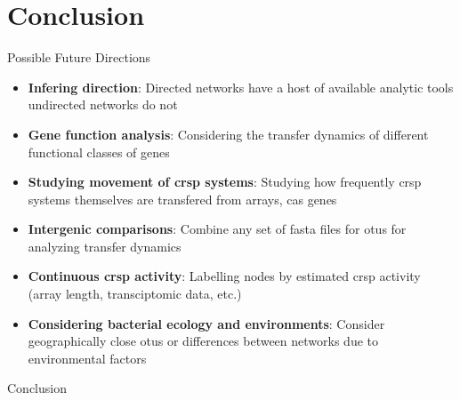 \documentclass[dvipsnames]{beamer}
\begin{document}
\section*{Conclusion}
\begin{frame}[fragile]{Possible Future Directions}
    \begin{itemize}
        \item<2-> \textbf{Infering direction}: Directed networks have a host of available analytic tools undirected networks do not
        \item<3-> \textbf{Gene function analysis}: Considering the transfer dynamics of different functional classes of genes
        \item<4-> \textbf{Studying movement of \ac{crsp} systems}: Studying how frequently \ac{crsp} systems themselves are transfered from arrays, cas genes
        \item<5-> \textbf{Intergenic comparisons}: Combine any set of fasta files for \ac{otu}s for analyzing transfer dynamics
        \item<6-> \textbf{Continuous \ac{crsp} activity}: Labelling nodes by estimated \ac{crsp} activity (array length, transciptomic data, etc.)
        \item<7-> \textbf{Considering bacterial ecology and environments}: Consider geographically close \ac{otu}s or differences between networks due to environmental factors
    \end{itemize}
\end{frame}
\begin{frame}[fragile]{}
    \begin{center}
        \Huge \textcolor{OliveGreen}{Conclusion}
    \end{center}
    \addtocounter{framenumber}{-1}
\end{frame}
\end{document}
